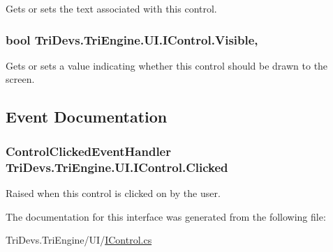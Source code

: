 Gets or sets the text associated with this control. 

\hypertarget{interface_tri_devs_1_1_tri_engine_1_1_u_i_1_1_i_control_a2431191a8fc8b2aabf08379762a2aa64}{
\subsubsection[{Visible}]{\setlength{\rightskip}{0pt plus 5cm}bool Tri\-Devs.\-Tri\-Engine.\-U\-I.\-I\-Control.\-Visible\hspace{0.3cm}{\ttfamily [get]}, {\ttfamily [set]}}}\label{interface_tri_devs_1_1_tri_engine_1_1_u_i_1_1_i_control_a2431191a8fc8b2aabf08379762a2aa64}


Gets or sets a value indicating whether this control should be drawn to the screen. 



\subsection{Event Documentation}
\hypertarget{interface_tri_devs_1_1_tri_engine_1_1_u_i_1_1_i_control_a067b637b46795dffc2e5b0c3ab2c6592}{
\subsubsection[{Clicked}]{\setlength{\rightskip}{0pt plus 5cm}Control\-Clicked\-Event\-Handler Tri\-Devs.\-Tri\-Engine.\-U\-I.\-I\-Control.\-Clicked}}\label{interface_tri_devs_1_1_tri_engine_1_1_u_i_1_1_i_control_a067b637b46795dffc2e5b0c3ab2c6592}


Raised when this control is clicked on by the user. 



The documentation for this interface was generated from the following file\-:\begin{DoxyCompactItemize}
\item 
Tri\-Devs.\-Tri\-Engine/\-U\-I/\hyperlink{_i_control_8cs}{I\-Control.\-cs}\end{DoxyCompactItemize}
